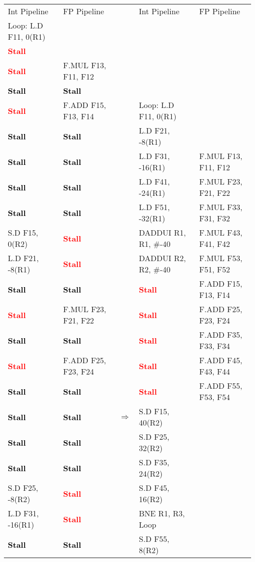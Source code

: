 \documentclass[11pt]{article}
\newcommand{\code}[1]{\textsf{#1}}
\newcommand{\stall}{\textcolor{red}{\textbf{Stall}}}
\newcommand{\cellstall}{\cellcolor{red!25}\textcolor{black}{\textbf{Stall}}}
\begin{document}
\begin{table}[h]
\begin{tabular}{llcll}
	 Int Pipeline & FP Pipeline & & Int Pipeline & FP Pipeline \\
	 \code{Loop:} \code{L.D F11, 0(R1)} &  & & & \\
	 \stall &  & & & \\
	 \stall & \code{F.MUL F13, F11, F12} & & & \\
	 \cellstall & \cellstall & & & \\
	 \stall & \code{F.ADD F15, F13, F14} & & \code{Loop:} \code{L.D F11, 0(R1)} &  \\
	 \cellstall & \cellstall & & \code{L.D F21, -8(R1)} &  \\
	 \cellstall & \cellstall &  & \code{L.D F31, -16(R1)} & \code{F.MUL F13, F11, F12} \\
	 \cellstall & \cellstall & & \code{L.D F41, -24(R1)} & \code{F.MUL F23, F21, F22} \\
	 \cellstall & \cellstall & & \code{L.D F51, -32(R1)} & \code{F.MUL F33, F31, F32} \\
	 \code{S.D F15, 0(R2)} & \stall & & \code{DADDUI R1, R1, \#-40} & \code{F.MUL F43, F41, F42} \\
	 \code{L.D F21, -8(R1)} & \stall & & \code{DADDUI R2, R2, \#-40} & \code{F.MUL F53, F51, F52} \\
	 \cellstall & \cellstall & & \stall & \code{F.ADD F15, F13, F14} \\ 
	 \stall & \code{F.MUL F23, F21, F22} & & \stall & \code{F.ADD F25, F23, F24} \\
	 \cellstall & \cellstall & & \stall & \code{F.ADD F35, F33, F34} \\
	 \stall & \code{F.ADD F25, F23, F24} & & \stall & \code{F.ADD F45, F43, F44} \\
	 \cellstall & \cellstall & & \stall & \code{F.ADD F55, F53, F54} \\
	 \cellstall & \cellstall & $\Rightarrow$ & \code{S.D F15, 40(R2)} &   \\
	 \cellstall & \cellstall & & \code{S.D F25, 32(R2)} &  \\ 
	 \cellstall & \cellstall & & \code{S.D F35, 24(R2)} &  \\
	 \code{S.D F25, -8(R2)} & \stall & & \code{S.D F45, 16(R2)} &  \\
	 \code{L.D F31, -16(R1)} & \stall & & \code{BNE R1, R3, Loop} &  \\ 
	 \cellstall & \cellstall & &  \code{S.D F55, 8(R2)} &  \\	

\end{tabular}
\end{table}
\end{document}
